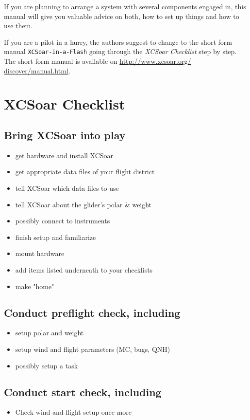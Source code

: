If you are planning to arrange a system with several components engaged in, 
this manual will give you valuable advice on both, how to set up things and how 
to use them.

If you are a pilot in a hurry, the authors suggest to change to the short form 
manual \texttt{XCSoar-in-a-Flash} going through the \emph{XCSoar Checklist} 
step by step. The short form manual is available on \url{http://www.xcsoar.org/
discover/manual.html}.



\section{XCSoar Checklist}

\subsection*{{Bring XCSoar into play}}
\begin{itemize}
\item get hardware and install XCSoar
\item get appropriate data files of your flight district
\item tell XCSoar which data files to use
\item tell XCSoar about the glider's polar \& weight
\item possibly connect to instruments
\item finish setup and familiarize
\item mount hardware
\item add items listed underneath to your checklists
\item make "home"
\end{itemize}

\subsection*{Conduct preflight check, including}
\begin{itemize}
\item setup polar and weight
\item setup wind and flight parameters (MC, bugs, QNH)
\item possibly setup a task
\end{itemize}

\subsection*{Conduct start check, including}
\begin{itemize}
\item Check wind and flight setup once more
\end{itemize}
\vspace{2em}

